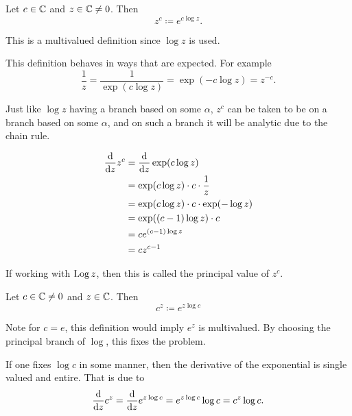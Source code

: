 \documentclass[../notes.tex]{subfiles}
\begin{document}
\begin{definition}
    Let $c \in \mathbb{C}$ and $z \in \mathbb{C} \neq 0$. Then
    \[
        z^c \coloneq e^{c \log z}
    .\]
    \begin{remark}
        This is a multivalued definition since $\log z$ is used.
    \end{remark}
\end{definition}

This definition behaves in ways that are expected. For example
\[
    \frac{1}{z} = \frac{1}{\exp(c \log z)} = \exp(-c \log z) = z^{-c}
.\]

Just like $\log z$ having a branch based on some $\alpha$, $z^c$ can be taken to be on a branch based on some $\alpha$, and on such a branch it will be analytic due to the chain rule.

\begin{align*}
    \dv{z} z^c &= \dv{z} \exp(c \log z) \\
    &= \exp(c \log z) \cdot c \cdot \frac{1}{z} \\
    &= \exp(c \log z) \cdot c \cdot \exp(-\log z) \\
    &= \exp((c-1) \log z) \cdot c \\
    &= c e^{(c-1) \log z} \\
    &= c z^{c-1}
\end{align*}

If working with $\operatorname{Log} z$, then this is called the principal value of $z^c$.

\begin{definition}
    Let $c \in \mathbb{C} \neq 0$ and $z \in \mathbb{C}$. Then
    \[
        c^z \coloneq e^{z \log c}
    \]
    \begin{remark}
        Note for $c = e$, this definition would imply $e^z$ is multivalued. By choosing the principal branch of $\log$, this fixes the problem.
    \end{remark}
\end{definition}

If one fixes $\log c$ in some manner, then the derivative of the exponential is single valued and entire. That is due to
\[
    \dv{z} c^z = \dv{z} e^{z \log c} = e^{z \log c} \log c = c^z \log c
.\]
\end{document}
